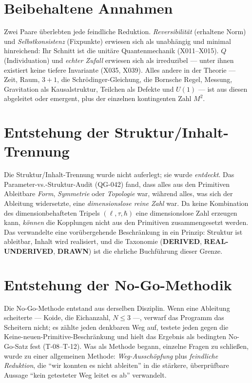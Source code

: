 \documentclass[10pt,twoside,openany]{book}
\newcommand{\derived}{\textbf{DERIVED}}
\newcommand{\realunder}{\textbf{REAL-UNDERIVED}}
\newcommand{\drawn}{\textbf{DRAWN}}
\begin{document}
\section{Beibehaltene Annahmen}

Zwei Paare überlebten jede feindliche Reduktion. \emph{Reversibilität} (erhaltene Norm)
und \emph{Selbstkonsistenz} (Fixpunkte) erwiesen sich als unabhängig und minimal
hinreichend: Ihr Schnitt ist die unitäre Quantenmechanik (X011--X015). \emph{$Q$}
(Individuation) und \emph{echter Zufall} erwiesen sich als irreduzibel --- unter ihnen
existiert keine tiefere Invariante (X035, X039). Alles andere in der Theorie --- Zeit,
Raum, $3{+}1$, die Schr\"odinger-Gleichung, die Bornsche Regel, Messung, Gravitation als
Kausalstruktur, Teilchen als Defekte und $U(1)$ --- ist aus diesen abgeleitet oder
emergent, plus der einzelnen kontingenten Zahl $M^2$.

\section{Entstehung der Struktur/Inhalt-Trennung}

Die Struktur/Inhalt-Trennung wurde nicht auferlegt; sie wurde \emph{entdeckt}. Das
Parameter-vs.-Struktur-Audit (QG-042) fand, dass alles aus den Primitiven Ableitbare
\emph{Form}, \emph{Symmetrie} oder \emph{Topologie} war, während alles, was sich der
Ableitung widersetzte, eine \emph{dimensionslose reine Zahl} war. Da keine Kombination des
dimensionbehafteten Tripels $(\ell,\tau,\hbar)$ eine dimensionslose Zahl erzeugen kann,
\emph{können} die Kopplungen nicht aus den Primitiven zusammengesetzt werden. Das
verwandelte eine vorübergehende Beschränkung in ein Prinzip: Struktur ist ableitbar,
Inhalt wird realisiert, und die Taxonomie (\derived, \realunder, \drawn) ist die ehrliche
Buchführung dieser Grenze.

\section{Entstehung der No-Go-Methodik}

Die No-Go-Methode entstand aus derselben Disziplin. Wenn eine Ableitung scheiterte ---
Koide, die Eichanzahl, $N\le3$ ---, verwarf das Programm das Scheitern nicht; es zählte
jeden denkbaren Weg auf, testete jeden gegen die Keine-neuen-Primitive-Beschränkung und
hielt das Ergebnis als bedingten No-Go-Satz fest (T-08--T-12). Was als Methode begann,
einzelne Fragen zu schließen, wurde zu einer allgemeinen Methode: \emph{Weg-Ausschöpfung}
plus \emph{feindliche Reduktion}, die ``wir konnten es nicht ableiten'' in die stärkere,
überprüfbare Aussage ``kein getesteter Weg leitet es ab'' verwandelt.
\end{document}
